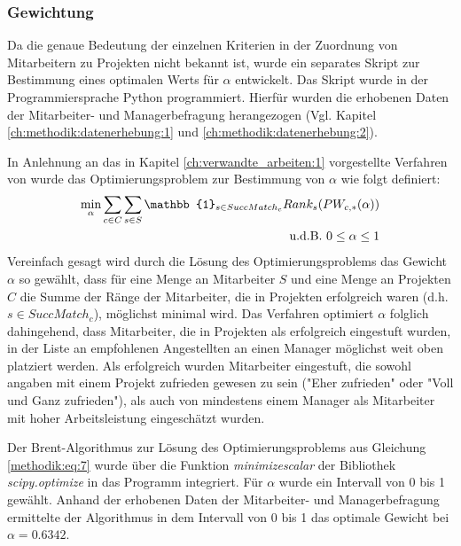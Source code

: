 \subsubsection{Gewichtung}
\label{ch:methodik:auswertung:gewichtung}
Da die genaue Bedeutung der einzelnen Kriterien in der Zuordnung von Mitarbeitern zu Projekten nicht bekannt ist, wurde ein separates Skript zur Bestimmung eines optimalen Werts für $\alpha$ entwickelt.
Das Skript wurde in der Programmiersprache Python programmiert.
Hierfür wurden die erhobenen Daten der Mitarbeiter- und Managerbefragung herangezogen (Vgl. Kapitel \ref{ch:methodik:datenerhebung:1} und \ref{ch:methodik:datenerhebung:2}).

In Anlehnung an das in Kapitel \ref{ch:verwandte_arbeiten:1} vorgestellte Verfahren von \textcite[S. 131ff.]{kleinerman:2:inproceedings} wurde das Optimierungsproblem zur Bestimmung von $\alpha$ wie folgt definiert:
\begin{equation}\label{methodik:eq:7}
    \begin{aligned}
        \min_{\alpha} \sum_{c \in C} \sum_{s \in S} \mathbb{1}_{s \in SuccMatch_{c}} Rank_{s} (PW_{c,*}(\alpha))\\
        \textnormal{u.d.B. } 0 \leq \alpha \leq 1\\
    \end{aligned}
\end{equation}
Vereinfach gesagt wird durch die Lösung des Optimierungsproblems das Gewicht $\alpha$ so gewählt, dass für eine Menge an Mitarbeiter $S$ und eine Menge an Projekten $C$ die Summe der Ränge der Mitarbeiter, die in Projekten erfolgreich waren (d.h. $s \in SuccMatch_{c}$), möglichst minimal wird.
Das Verfahren optimiert $\alpha$ folglich dahingehend, dass Mitarbeiter, die in Projekten als erfolgreich eingestuft wurden, in der Liste an empfohlenen Angestellten an einen Manager möglichst weit oben platziert werden.
Als erfolgreich wurden Mitarbeiter eingestuft, die sowohl angaben mit einem Projekt zufrieden gewesen zu sein ("Eher zufrieden" oder "Voll und Ganz zufrieden"), als auch von mindestens einem Manager als Mitarbeiter mit hoher Arbeitsleistung eingeschätzt wurden.

Der Brent-Algorithmus zur Lösung des Optimierungsproblems aus Gleichung \ref{methodik:eq:7} wurde über die Funktion \textit{minimize\textunderscore scalar} der Bibliothek \textit{scipy.opti\-mize} in das Programm integriert.
Für $\alpha$ wurde ein Intervall von 0 bis 1 gewählt.
Anhand der erhobenen Daten der Mitarbeiter- und Managerbefragung ermittelte der Algorithmus in dem Intervall von 0 bis 1 das optimale Gewicht bei $\alpha = 0.6342$.

